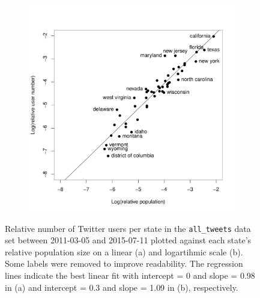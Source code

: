 \documentclass[11pt, a4paper,twoside]{report}\usepackage[]{graphicx}\usepackage[]{color}
\begin{document}
\begin{figure}[H]
  \begin{subfigure}[t]{0.6\textwidth}
  \includegraphics[width=1\linewidth]{19_ScatterTweetPop_user_log.pdf}
  \caption{}
  \label{fig:tweets_state_full_scatter_user_log}
  \end{subfigure}

\caption{Relative number of Twitter users per state in the \texttt{all\_tweets} data set between 2011-03-05 and 2015-07-11 plotted against each state's relative population size on a linear (a) and logartihmic scale (b). Some labels were removed to improve readability. The regression lines indicate the best linear fit with intercept = 0 and slope = 0.98 in (a) and intercept = 0.3 and slope = 1.09 in (b), respectively.}
\end{figure}
\end{document}
